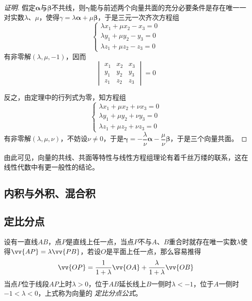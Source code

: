 \begin{proof}[证明]
假定$\bm{\alpha}$与$\bm{\beta}$不共线，则$\bm{\gamma}$能与前述两个向量共面的充分必要条件是存在唯一一对实数$\lambda$、$\mu$，使得$\gamma=\lambda \bm{\alpha} + \mu \bm{\beta}$，于是三元一次齐次方程组
\[
  \left\{
    \begin{array}{lll}
      \lambda x_1 + \mu x_2 - x_3 = 0  \\
      \lambda y_1 + \mu y_2 - y_3 = 0 \\
      \lambda z_1 + \mu z_2 - z_3 = 0
    \end{array}
    \right.
\]
有非零解$(\lambda, \mu, -1)$，因而
\[
  \begin{vmatrix}
    x_1 & x_2 & x_3\\
    y_1 & y_2 & y_3 \\
    z_1 & z_2 & z_3 
  \end{vmatrix}
  = 0
\]

反之，由定理中的行列式为零，知方程组
\[
  \left\{
    \begin{array}{lll}
      \lambda x_1 + \mu x_2 + \nu x_3 = 0  \\
      \lambda y_1 + \mu y_2 + \nu y_3 = 0 \\
      \lambda z_1 + \mu z_2 + \nu z_3 = 0
    \end{array}
    \right.
\]
有非零解$(\lambda, \mu, \nu)$，不妨设$\nu \neq 0$，于是$\bm{\gamma} = -\dfrac{\lambda}{\nu} \bm{\alpha} - \dfrac{\mu}{\nu} \bm{\beta}$，于是三个向量共面。
\end{proof}

由此可见，向量的共线、共面等特性与线性方程组理论有着千丝万缕的联系，这在线性代数中有更一般性的结论。

\subsection{内积与外积、混合积}
\label{sec:product-of-vector}



\subsection{定比分点}
\label{sec:definition-proportion}

设有一直线$AB$，点$P$是直线上任一点，当点$P$不与$A$、$B$重合时就存在唯一实数$\lambda$使得$\vv{AP}=\lambda\vv{PB}$，若设$O$是平面上任一点，那么容易推得
\begin{equation}
  \label{eq:vector-definition-proportion}
  \vv{OP} = \frac{1}{1+\lambda} \vv{OA} + \frac{\lambda}{1+\lambda} \vv{OB}
\end{equation}
当点$P$位于线段$AP$上时$\lambda>0$，位于$AB$延长线上$B$一侧时$\lambda<-1$，位于$A$一侧时$-1<\lambda<0$，上式称为向量的 \emph{定比分点公式}。

